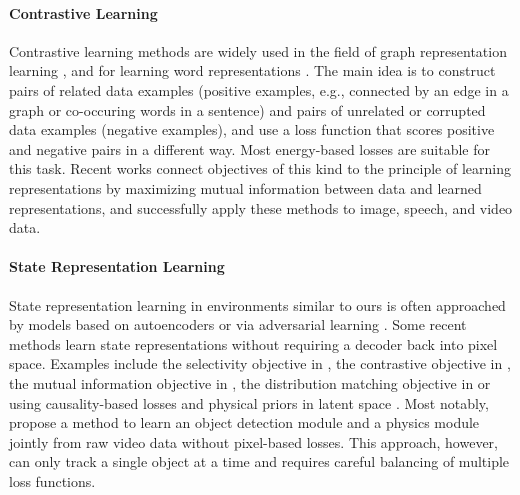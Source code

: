 \documentclass{article} %
\begin{document}
\paragraph{Contrastive Learning}
Contrastive learning methods are widely used in the field of graph representation learning \citep{bordes2013translating,perozzi2014deepwalk,grover2016node2vec,bordes2013translating,schlichtkrull2018modeling,velivckovic2018deep}, and for learning word representations \citep{mnih2012fast,mikolov2013efficient}. The main idea is to construct pairs of related data examples (positive examples, e.g., connected by an edge in a graph or co-occuring words in a sentence) and pairs of unrelated or corrupted data examples (negative examples), and use a loss function that scores positive and negative pairs in a different way. Most energy-based losses \citep{lecun2006tutorial} are suitable for this task. Recent works \citep{oord2018representation,hjelm2018learning,henaff2019data,sun2019contrastive,anand2019unsupervised} connect objectives of this kind to the principle of learning representations by maximizing mutual information between data and learned representations, and successfully apply these methods to image, speech, and video data.

\paragraph{State Representation Learning} State representation learning in environments similar to ours is often approached by models based on autoencoders \citep{corneil2018efficient, watter2015embed, ha2018world, hafner2018learning, laversanne2018curiosity} or via adversarial learning \citep{kurutach2018learning, wang2019learning}. Some recent methods learn state representations without requiring a decoder back into pixel space. Examples include the selectivity objective in \citet{thomas2018disentangling}, the contrastive objective in \citet{franccois2018combined}, the mutual information objective in \citet{anand2019unsupervised}, the distribution matching objective in \citet{gelada2019deepmdp} or using causality-based losses and physical priors in latent space \citep{jonschkowski2015learning,ehrhardt2018unsupervised}. Most notably, \citet{ehrhardt2018unsupervised} propose a method to learn an object detection module and a physics module jointly from raw video data without pixel-based losses. This approach, however, can only track a single object at a time and requires careful balancing of multiple loss functions.
\end{document}
